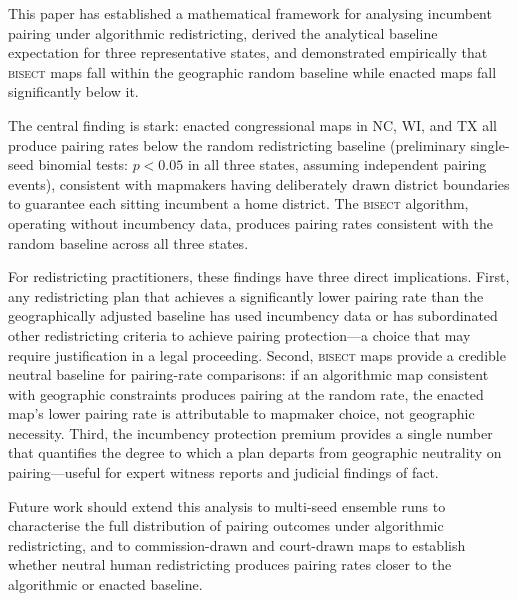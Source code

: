 \label{sec:conclusion}

This paper has established a mathematical framework for analysing incumbent pairing
under algorithmic redistricting, derived the analytical baseline expectation for three
representative states, and demonstrated empirically that \textsc{bisect} maps fall
within the geographic random baseline while enacted maps fall significantly below it.

The central finding is stark: enacted congressional maps in NC, WI, and TX all produce
pairing rates below the random redistricting baseline (preliminary single-seed binomial
tests: $p < 0.05$ in all three states, assuming independent pairing events), consistent
with mapmakers having deliberately drawn district boundaries to guarantee each sitting
incumbent a home district. The \textsc{bisect} algorithm, operating without incumbency data,
produces pairing rates consistent with the random baseline across all three states.

For redistricting practitioners, these findings have three direct implications.
First, any redistricting plan that achieves a significantly lower pairing rate than
the geographically adjusted baseline has used incumbency data or has subordinated
other redistricting criteria to achieve pairing protection---a choice that may require
justification in a legal proceeding. Second, \textsc{bisect} maps provide a credible
neutral baseline for pairing-rate comparisons: if an algorithmic map consistent with
geographic constraints produces pairing at the random rate, the enacted map's lower
pairing rate is attributable to mapmaker choice, not geographic necessity. Third, the
incumbency protection premium provides a single number that quantifies the degree to
which a plan departs from geographic neutrality on pairing---useful for expert witness
reports and judicial findings of fact.

Future work should extend this analysis to multi-seed ensemble runs to characterise
the full distribution of pairing outcomes under algorithmic redistricting, and to
commission-drawn and court-drawn maps to establish whether neutral human redistricting
produces pairing rates closer to the algorithmic or enacted baseline.

